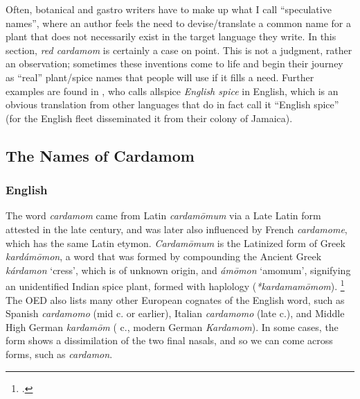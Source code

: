 Often, botanical and gastro writers have to make up what I call ``speculative names'', where an author feels the need to devise/translate a common name for a plant that does not necessarily exist in the target language they write. In this section, \textit{red cardamom} is certainly a case on point. This is not a judgment, rather an observation; sometimes these inventions come to life and begin their journey as ``real'' plant/spice names that people will use if it fills a need. Further examples are found in \textcite[64]{raghavan_handbook_2007}, who calls allspice \textit{English spice} in English, which is an obvious translation from other languages that do in fact call it ``English spice'' (for the English fleet disseminated it from their colony of Jamaica).

\subsection{The Names of Cardamom}

\subsubsection{English}





The word \textit{cardamom} came from Latin \textit{cardamōmum} via a Late Latin form attested in the late  century, and was later also influenced by French \textit{cardamome}, which has the same Latin etymon. \textit{Cardamōmum} is the Latinized form of Greek  \textit{kardámōmon}, a word that was formed by compounding the Ancient Greek  \textit{kárdamon} `cress', which is of unknown origin, and  \textit{ámōmon} `amomum', signifying an unidentified Indian spice plant, formed with haplology (\textit{*kardamamōmom}). \footcites[cardamom]{oed}[cardamom]{ahd} The \gls{OED} also lists many other European cognates of the English word, such as Spanish \textit{cardamomo} (mid  c. or earlier), Italian \textit{cardamomo} (late  c.), and Middle High German \textit{kardamōm} ( c., modern German \textit{Kardamom}).
In some cases, the form shows a dissimilation of the two final nasals, and so we can come across forms, such as \textit{cardamon}.


